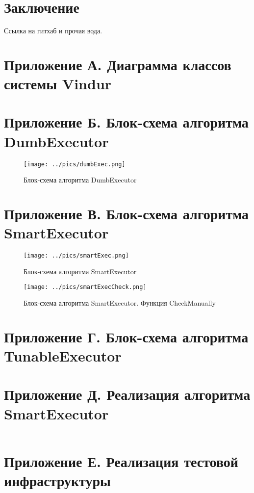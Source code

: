 \documentclass{matmex-diploma}
\begin{document}
\section*{Заключение}
    Ссылка на гитхаб и прочая вода.



\section*{Приложение А. Диаграмма классов системы Vindur}
\section*{Приложение Б. Блок-схема алгоритма DumbExecutor}
    \begin{figure}[H]
        \label{dumbAlgo}
        \centering
        \texttt{[image: ../pics/dumbExec.png]}
        \caption{Блок-схема алгоритма DumbExecutor}
    \end{figure}
\section*{Приложение В. Блок-схема алгоритма SmartExecutor}
    \begin{figure}[H]
        \label{smartAlgo}
        \centering
        \texttt{[image: ../pics/smartExec.png]}
        \caption{Блок-схема алгоритма SmartExecutor}
    \end{figure}
    \begin{figure}[H]
        \label{smartCheck}
        \centering
        \texttt{[image: ../pics/smartExecCheck.png]}
        \caption{Блок-схема алгоритма SmartExecutor. Функция CheckManually}
    \end{figure}
\section*{Приложение Г. Блок-схема алгоритма TunableExecutor}
\section*{Приложение Д. Реализация алгоритма SmartExecutor}
    \inputminted[breaklines=true]{java}{../sources/SmartExecutor.java}
\section*{Приложение Е. Реализация тестовой инфраструктуры}
    \inputminted[breaklines=true]{java}{../sources/TuningTest.java}
\end{document}
